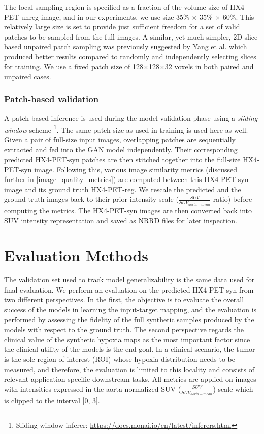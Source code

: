The local sampling region is specified as a fraction of the volume size of HX4-PET-unreg image, and in our experiments, we use size 35\% $\times$ 35\% $\times$ 60\%. This relatively large size is set to provide just sufficient freedom for a set of valid patches to be sampled from the full images. A similar, yet much simpler, 2D slice-based unpaired patch sampling was previously suggested by Yang et al. \cite{yang2018unpaired} which produced better results compared to randomly and independently selecting slices for training. We use a fixed patch size of 128$\times$128$\times$32 voxels in both paired and unpaired cases.


\subsubsection{Patch-based validation}
A patch-based inference is used during the model validation phase using a \textit{sliding window} scheme \footnote{Sliding window inferer: \url{https://docs.monai.io/en/latest/inferers.html}}. The same patch size as used in training is used here as well. Given a pair of full-size input images, overlapping patches are sequentially extracted and fed into the GAN model independently. Their corresponding predicted HX4-PET-syn patches are then stitched together into the full-size HX4-PET-syn image. Following this, various image similarity metrics (discussed further in \ref{image_quality_metrics}) are computed between this HX4-PET-syn image and its ground truth HX4-PET-reg. We rescale the predicted and the ground truth images back to their prior intensity scale ($\frac{SUV}{SUV_{aorta-mean}}$ ratio) before computing the metrics. The HX4-PET-syn images are then converted back into SUV intensity representation and saved as NRRD files for later inspection.



\section{Evaluation Methods}
\label{Evaluation_Methods}
The validation set used to track model generalizability is the same data used for final evaluation. We perform an evaluation on the predicted HX4-PET-syn from two different perspectives. In the first, the objective is to evaluate the overall success of the models in learning the input-target mapping, and the evaluation is performed by assessing the fidelity of the full synthetic samples produced by the models with respect to the ground truth. The second perspective regards the clinical value of the synthetic hypoxia maps as the most important factor since the clinical utility of the models is the end goal. In a clinical scenario, the tumor is the sole region-of-interest (ROI) whose hypoxia distribution needs to be measured, and therefore, the evaluation is limited to this locality and consists of relevant application-specific downstream tasks. All metrics are applied on images with intensities expressed in the aorta-normalized SUV ($\frac{SUV}{SUV_{aorta-mean}}$) scale which is clipped to the interval [0, 3]. 


